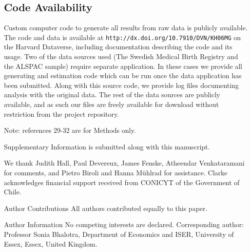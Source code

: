 \documentclass{nature}
\begin{document}
\begin{linenumbers}
\subsection{Code Availability}
Custom computer code to generate all results from raw data is publicly available. The code and data is available at \texttt{http://dx.doi.org/10.7910/DVN/KH06MG} on the Harvard Dataverse, including documentation describing the code and its usage.  Two of the data sources used (The Swedish Medical Birth Registry and the ALSPAC sample) require separate application.  In these cases we provide all generating and estimation code which can be run once the data application has been submitted.  Along with this source code, we provide log files documenting analysis with the original data.  The rest of the data sources are publicly available, and as such our files are freely available for download without restriction from the project repository.




\clearpage

Note: references 29-32 are for Methods only.

\clearpage
\begin{addendum}
 \item[Supplementary Information] is submitted along with this manuscript.
 \item We thank Judith Hall, Paul Devereux, James Fenske, Atheendar Venkataramani for comments, and Pietro Biroli and Hanna M\"uhlrad for assistance.  Clarke acknowledges financial support received from CONICYT of the Government of Chile.
 \item[Author Contributions] All authors contributed equally to this paper.
 \item[Author Information] No competing interests are declared.  Corresponding author: Professor Sonia Bhalotra, Department of Economics and ISER, University of Essex, Essex, United Kingdom.
\end{addendum}


\end{linenumbers}
\end{document}
